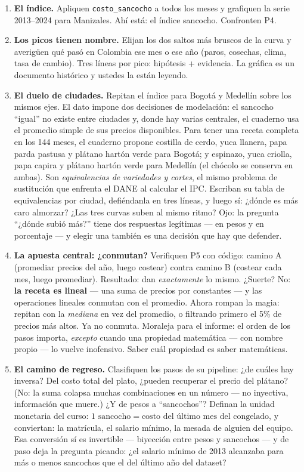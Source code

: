 \documentclass[12pt,letterpaper]{article}
\begin{document}
\begin{enumerate}[label=\arabic*.]
    \item \textbf{El índice.} Apliquen \texttt{costo\_sancocho} a todos los meses y grafiquen la serie 2013--2024 para Manizales. Ahí está: el índice sancocho. Confronten P4.
    \item \textbf{Los picos tienen nombre.} Elijan los dos saltos más bruscos de la curva y averigüen qué pasó en Colombia ese mes o ese año (paros, cosechas, clima, tasa de cambio). Tres líneas por pico: hipótesis + evidencia. La gráfica es un documento histórico y ustedes la están leyendo.
    \item \textbf{El duelo de ciudades.} Repitan el índice para Bogotá y Medellín sobre los mismos ejes. El dato impone dos decisiones de modelación: el sancocho ``igual'' no existe entre ciudades y, donde hay varias centrales, el cuaderno usa el promedio simple de sus precios disponibles. Para tener una receta completa en los 144 meses, el cuaderno propone costilla de cerdo, yuca llanera, papa parda pastusa y plátano hartón verde para Bogotá; y espinazo, yuca criolla, papa capira y plátano hartón verde para Medellín (el chócolo se conserva en ambas). Son \emph{equivalencias de variedades y cortes}, el mismo problema de sustitución que enfrenta el DANE al calcular el IPC. Escriban su tabla de equivalencias por ciudad, defiéndanla en tres líneas, y luego sí: ¿dónde es más caro almorzar? ¿Las tres curvas suben al mismo ritmo? Ojo: la pregunta ``¿dónde subió más?'' tiene dos respuestas legítimas --- en pesos y en porcentaje --- y elegir una también es una decisión que hay que defender.
    \item \textbf{La apuesta central: ¿conmutan?} Verifiquen P5 con código: camino A (promediar precios del año, luego costear) contra camino B (costear cada mes, luego promediar). Resultado: dan \emph{exactamente} lo mismo. ¿Suerte? No: \textbf{la receta es lineal} --- una suma de precios por constantes --- y las operaciones lineales conmutan con el promedio. Ahora rompan la magia: repitan con la \emph{mediana} en vez del promedio, o filtrando primero el 5\% de precios más altos. Ya no conmuta. Moraleja para el informe: el orden de los pasos importa, \emph{excepto} cuando una propiedad matemática --- con nombre propio --- lo vuelve inofensivo. Saber cuál propiedad es saber matemáticas.
    \item \textbf{El camino de regreso.} Clasifiquen los pasos de su pipeline: ¿de cuáles hay inversa? Del costo total del plato, ¿pueden recuperar el precio del plátano? (No: la suma colapsa muchas combinaciones en un número --- no inyectiva, información que muere.) ¿Y de pesos a ``sancochos''? Definan la unidad monetaria del curso: $1 \text{ sancocho} = \text{costo del último mes del congelado}$, y conviertan: la matrícula, el salario mínimo, la mesada de alguien del equipo. Esa conversión sí es invertible --- biyección entre pesos y sancochos --- y de paso deja la pregunta picando: ¿el salario mínimo de 2013 alcanzaba para más o menos sancochos que el del último año del dataset?

\end{enumerate}
\end{document}
